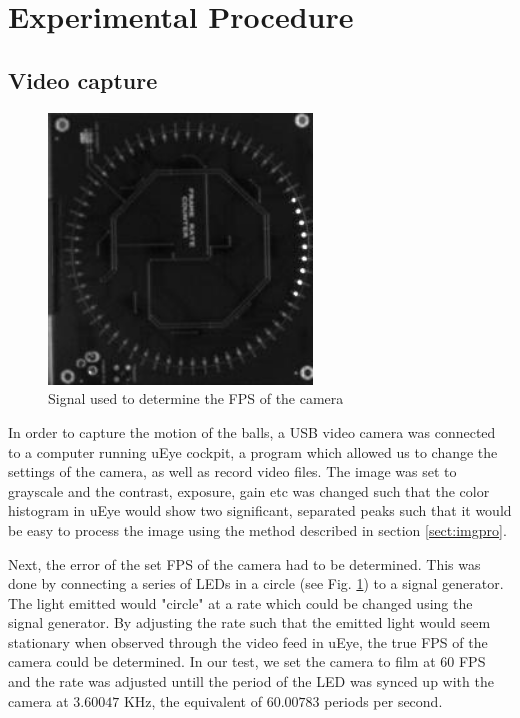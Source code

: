 \documentclass[11pt,a4paper]{article}
\begin{document}
\section{\label{section:experimental}Experimental Procedure} 
  
  \subsection{Video capture\label{subsect:vidcap}}
    
    \begin{figure}[H]
      \center
      \includegraphics[width=7cm]{scripts/figs/sync_fps.png}
      \caption{Signal used to determine the FPS of the camera}
      \label{fig:FpsSignal}
    \end{figure}
  
    In order to capture the motion of the balls, a USB video camera was connected to a computer running uEye cockpit\cite{_ueye_????}, a program which allowed us to change the settings of the camera, as well as record video files. The image was set to grayscale and the contrast, exposure, gain etc was changed such that the color histogram in uEye would show two significant, separated peaks such that it would be easy to process the image using the method described in section \ref{sect:imgpro}.

    Next, the error of the set FPS of the camera had to be determined. This was done by connecting a series of LEDs in a circle (see Fig. \ref{fig:FpsSignal}) to a signal generator. The light emitted would "circle" at a rate which could be changed using the signal generator. By adjusting the rate such that the emitted light would seem stationary when observed through the video feed in uEye, the true FPS of the camera could be determined. In our test, we set the camera to film at 60 FPS and the rate was adjusted untill the period of the LED was synced up with the camera at $3.60047$ KHz, the equivalent of $60.00783$ periods per second.
\end{document}
